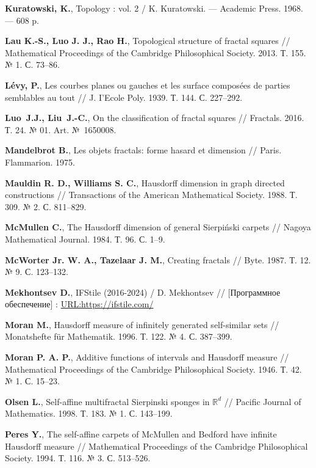 \begin{thebibliography}{99}
{\bf Kuratowski, K.},
Topology : vol. 2 / 
K. Kuratowski. --- Academic Press. 1968. --- 608 p.

{\bf Lau K.-S., Luo J. J., Rao H.},
Topological structure of fractal squares // 
Mathematical Proceedings of the Cambridge Philosophical Society. 2013. Т. 155. № 1. С. 73--86.

{\bf L{\'e}vy, P.}, 
Les courbes planes ou gauches et les surface compos{\'e}es de parties semblables au tout // 
J. I’Ecole Poly. 1939. Т. 144. С. 227--292.

{\bf Luo~J.J., Liu~J.-C.},
On the classification of fractal squares
// Fractals. 2016. Т. 24. № 01. Art. №~1650008.

{\bf Mandelbrot B.},
Les objets fractals: forme hasard et dimension // 
Paris. Flammarion. 1975.

{\bf Mauldin R. D., Williams S. C.},
Hausdorff dimension in graph directed constructions // 
Transactions of the American Mathematical Society. 1988. Т. 309. № 2. С. 811--829.

{\bf McMullen C.},
The Hausdorff dimension of general Sierpiński carpets // 
Nagoya Mathematical Journal. 1984. Т. 96. С. 1–9.

{\bf McWorter Jr. W. A., Tazelaar J. M.},
Creating fractals // 
Byte. 1987. Т. 12. № 9. С. 123--132.

{\bf Mekhontsev D.}, 
IFStile (2016-2024) / D. Mekhontsev // [Программное обеспечение] : 
\href{https://ifstile.com/}{URL:https://ifstile.com/}

{\bf Moran M.},
Hausdorff measure of infinitely generated self-similar sets // 
Monatshefte für Mathematik. 1996. Т. 122. № 4. С. 387--399.

{\bf Moran P. A. P.},
Additive functions of intervals and Hausdorff measure // 
Mathematical Proceedings of the Cambridge Philosophical Society. 1946. Т. 42. № 1. С. 15–23.

{\bf Olsen L.}, 
Self-affine multifractal Sierpinski sponges in $\mathbb{R}^d$ // 
Pacific Journal of Mathematics. 1998. Т. 183. № 1. С. 143--199.

{\bf Peres Y.},
The self-affine carpets of McMullen and Bedford have infinite Hausdorff measure // 
Mathematical Proceedings of the Cambridge Philosophical Society. 1994. Т. 116. № 3. С. 513--526.


\end{thebibliography}
